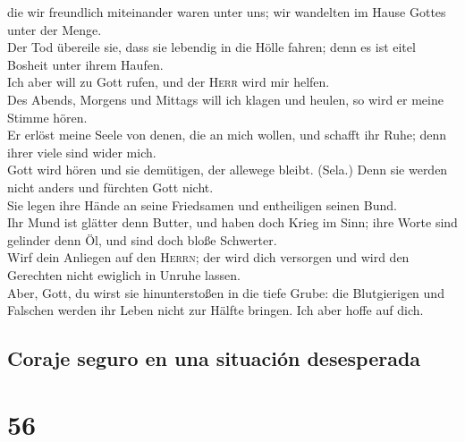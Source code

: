  die wir freundlich miteinander waren unter uns; wir
wandelten im Hause Gottes unter der Menge.\\
 Der Tod übereile sie, dass sie lebendig in die Hölle
fahren; denn es ist eitel Bosheit unter ihrem Haufen.\\
 Ich aber will zu Gott rufen, und der \textsc{Herr} wird
mir helfen.\\
 Des Abends, Morgens und Mittags will ich klagen und
heulen, so wird er meine Stimme hören.\\
 Er erlöst meine Seele von denen, die an mich wollen, und
schafft ihr Ruhe; denn ihrer viele sind wider mich.\\
 Gott wird hören und sie demütigen, der allewege bleibt.
(Sela.) Denn sie werden nicht anders und fürchten Gott nicht.\\
 Sie legen ihre Hände an seine Friedsamen und entheiligen
seinen Bund.\\
 Ihr Mund ist glätter denn Butter, und haben doch Krieg
im Sinn; ihre Worte sind gelinder denn Öl, und sind doch bloße
Schwerter.\\
 Wirf dein Anliegen auf den \textsc{Herrn}; der wird dich
versorgen und wird den Gerechten nicht ewiglich in Unruhe lassen.\\
 Aber, Gott, du wirst sie hinunterstoßen in die tiefe
Grube: die Blutgierigen und Falschen werden ihr Leben nicht zur Hälfte
bringen. Ich aber hoffe auf dich.

\hypertarget{coraje-seguro-en-una-situaciuxf3n-desesperada}{%
\subsection{Coraje seguro en una situación
desesperada}\label{coraje-seguro-en-una-situaciuxf3n-desesperada}}

\hypertarget{section-55}{%
\section{56}\label{section-55}}

